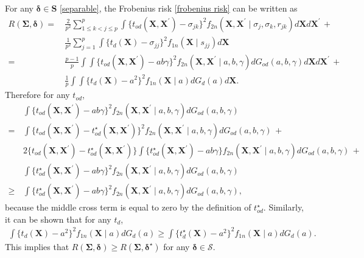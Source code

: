 \documentclass{article}
\def\bs{\mathbf}
\begin{document}
For any $\bs{\delta} \in \bs{S}$ \eqref{separable}, the Frobenius risk \eqref{frobenius risk} can be written as
\begin{align*}
  R(\bs{\Sigma}, \boldsymbol{\delta})
  =\,&
       \frac{2}{p^2} \sum_{1\leq k<j\leq p}^p
       \int \{t_{od}(\bs{X},\bs{X}^{\prime}) - \sigma_{jk} \}^2 f_{2n}(\bs{X}, \bs{X}^{\prime} \mid \sigma_j, \sigma_k, r_{jk}) d\bs{X}d\bs{X}^{\prime} \,+\\
  &
       \frac{1}{p^2}
       \sum_{j=1}^p
       \int \{t_d(\bs{X}) - \sigma_{jj} \}^2 f_{1n}(\bs{X} \mid s_{jj}) d\bs{X}\\
  =\,&
       \frac{p-1}{p}\int \int \{t_{od}(\bs{X},\bs{X}^{\prime}) - a b \gamma \}^2 f_{2n}(\bs{X}, \bs{X}^{\prime} \mid a, b, \gamma) dG_{od}(a, b, \gamma) d\bs{X}d\bs{X}^{\prime} \, +\\
     &
       \frac{1}{p}\int \int \{t_d(\bs{X}) - a^2\}^2 f_{1n}(\bs{X} \mid a) dG_{d}(a) d\bs{X}.
\end{align*}
Therefore for any $t_{od}$,
\begin{align*}
  &
    \int \{t_{od}(\bs{X},\bs{X}^{\prime}) - a b \gamma \}^2 f_{2n}(\bs{X}, \bs{X}^{\prime} \mid a, b, \gamma) dG_{od}(a, b, \gamma) \\
  =\,&
       \int \{t_{od}(\bs{X},\bs{X}^{\prime}) - t_{od}^\star(\bs{X}, \bs{X}^\prime)\}^2 f_{2n}(\bs{X}, \bs{X}^{\prime} \mid a, b, \gamma) dG_{od}(a, b, \gamma) \,+\\
  &
    2 \{t_{od}(\bs{X},\bs{X}^{\prime}) - t_{od}^\star(\bs{X}, \bs{X}^\prime)\} \int 
  \{t_{od}^\star(\bs{X}, \bs{X}^\prime) - a b \gamma \}
  f_{2n}(\bs{X}, \bs{X}^{\prime} \mid a, b, \gamma) dG_{od}(a, b, \gamma) \,+\\
  &
    \int \{t_{od}^\star(\bs{X}, \bs{X}^\prime) - a b \gamma\}^2 f_{2n}(\bs{X}, \bs{X}^{\prime} \mid a, b, \gamma) dG_{od}(a, b, \gamma) \\
  \geq\,&
          \int \{t_{od}^\star(\bs{X}, \bs{X}^\prime) - a b \gamma\}^2 f_{2n}(\bs{X}, \bs{X}^{\prime} \mid a, b, \gamma) dG_{od}(a, b, \gamma),
\end{align*}
because the middle cross term is equal to zero by the definition of $t^\star_{od}$. Similarly, it can be shown that for any $t_d$,
\begin{align*}
  \int \{t_d(\bs{X}) - a^2\}^2 f_{1n}(\bs{X} \mid a) dG_{d}(a)
  \geq
  \int \{t_d^\star(\bs{X}) - a^2\}^2 f_{1n}(\bs{X} \mid a) dG_{d}(a).
\end{align*}
This implies that $R(\bs{\Sigma}, \bs{\delta}) \geq R(\bs{\Sigma}, \bs{\delta}^\star)$ for any $\bs{\delta} \in \mathcal{S}$.

 

\end{document}
